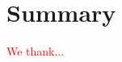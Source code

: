 \documentclass[linenumbers, twocolumn, times]{aastex631}
\begin{document}
\section{Summary} \label{sec:summary}


\begin{acknowledgments}
\textcolor{red}{We thank...}
\end{acknowledgments}

%

\vspace{5mm}
\facilities{\textcolor{red}{facilities used here}}


\software{\textcolor{red}{software references here}}



\appendix





\end{document}
